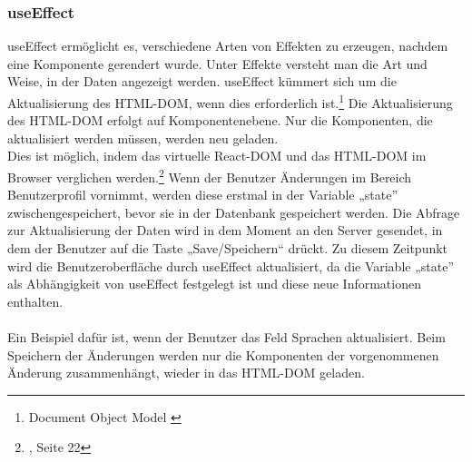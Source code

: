 \subsubsection*{useEffect}
useEffect ermöglicht es, verschiedene Arten von Effekten zu erzeugen, nachdem eine Komponente gerendert wurde. Unter Effekte versteht man die Art und Weise, in der Daten angezeigt werden. useEffect kümmert sich um die Aktualisierung des HTML-DOM, wenn dies erforderlich ist.\footnote{Document Object Model {\cite{MO2}}} Die Aktualisierung des HTML-DOM erfolgt auf Komponentenebene. Nur die Komponenten, die aktualisiert werden müssen, werden neu geladen.\\
Dies ist möglich, indem  das virtuelle React-DOM und das HTML-DOM im Browser verglichen werden\cite{R06}.\footnote{{\cite{AN1}, Seite 22}} Wenn der Benutzer Änderungen im Bereich Benutzerprofil vornimmt, werden diese erstmal in der Variable „state” zwischengespeichert, bevor sie in der Datenbank gespeichert werden. Die Abfrage zur Aktualisierung der Daten wird in dem Moment an den Server gesendet, in dem der Benutzer auf die Taste „Save/Speichern“ drückt. Zu diesem Zeitpunkt wird die Benutzeroberfläche durch useEffect aktualisiert, da die Variable „state” als Abhängigkeit von useEffect festgelegt ist und diese neue Informationen enthalten.
\\\\
Ein Beispiel dafür ist, wenn der Benutzer das Feld Sprachen aktualisiert. Beim Speichern der Änderungen werden nur die Komponenten der vorgenommenen Änderung zusammenhängt, wieder in das HTML-DOM geladen.

